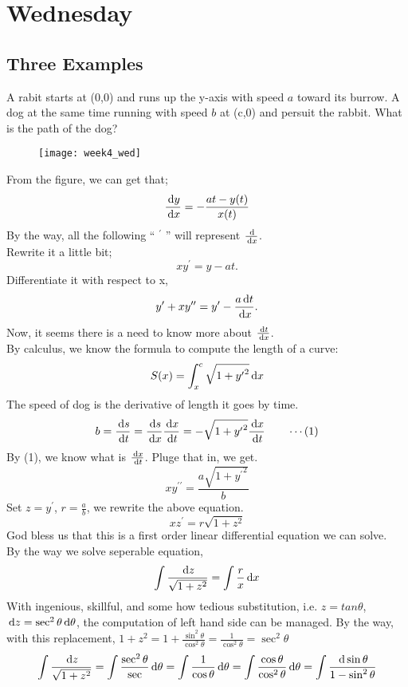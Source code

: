 

\section{Wednesday}
\subsection{Three Examples}
\begin{example}
A rabit starts at (0,0) and runs up  the y-axis with speed $a$ toward its burrow. A dog at the same time running with speed $b$ at (c,0) and persuit the rabbit. What is the path of the dog?\\
\begin{figure}[H]
\centering
\texttt{[image: week4\_wed]}
\end{figure}
From the figure, we can get that;
\[\frac{\,\mathrm{d} y}{\,\mathrm{d} x}=-\frac{at-y(t)}{x(t)}
\]
By the way, all the following `` $^\prime$ '' will represent $\frac{\,\mathrm{d}}{\,\mathrm{d} x}$.\\
Rewrite it a little bit;
\[xy^\prime=y-at .
\]
Differentiate it with respect to x,
\[y^\prime+xy^{\prime\prime}=y^\prime-\frac{a\,\mathrm{d} t}{\,\mathrm{d} x}.
\]
Now, it seems there is a need to know more about $\frac{\,\mathrm{d} t}{\,\mathrm{d} x}$.\\
By calculus, we know the formula to compute the length of a curve:
\[S(x)=\int_x^c\sqrt{1+{y^{\prime}}^{2}}\,\mathrm{d} x
\]
The speed of dog is the derivative of length it goes by time.
\[b=\frac{\,\mathrm{d} s}{\,\mathrm{d} t}=\frac{\,\mathrm{d} s}{\,\mathrm{d} x}\frac{\,\mathrm{d} x}{\,\mathrm{d} t}=-\sqrt{1+{y^{\prime}}^2}\frac{\,\mathrm{d} x}{\,\mathrm{d} t}\qquad\cdots(1)
\]
By (1), we know what is $\frac{\,\mathrm{d} x}{\,\mathrm{d} t}$. Pluge that in, we get.
\[xy^{\prime\prime}=\frac{a\sqrt{1+{y^{\prime}}^2}}{b}
\]
Set $z=y^\prime$, $r=\frac{a}{b}$, we rewrite the above equation.
\[xz^\prime=r\sqrt{1+z^2}
\]
God bless us that this is a first order linear differential equation we can solve.\\
By the way we solve seperable equation,
\[\int\frac{\,\mathrm{d} z}{\sqrt{1+z^2}}=\int\frac{r}{x}\,\mathrm{d} x
\]
With ingenious, skillful, and some how tedious substitution, i.e. $z=tan\theta$, $\,\mathrm{d} z=\sec^2\theta\,\mathrm{d}\theta$, the computation of left hand side can be managed. By the way, with this replacement, $1+z^2=1+\frac{\sin^2\theta}{\cos^2\theta}=\frac{1}{\cos^2\theta}=\sec^2\theta$
\[\int\frac{\,\mathrm{d} z}{\sqrt{1+z^2}}=\int\frac{\sec^2\theta}{\sec}\,\mathrm{d}\theta=\int\frac{1}{\cos\theta}\,\mathrm{d}\theta=\int\frac{\cos\theta}{\cos^2\theta}\,\mathrm{d} \theta=\int\frac{\,\mathrm{d}\sin\theta}{1-\sin^2\theta}
\]
\end{example}
